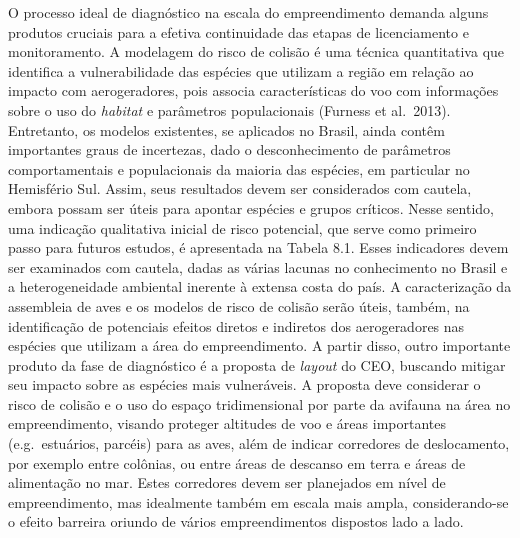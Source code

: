 \documentclass[
  oneside]{scrbook}
\begin{document}
O processo ideal de diagnóstico na escala do empreendimento demanda alguns produtos cruciais para a efetiva continuidade das etapas de licenciamento e monitoramento. A modelagem do risco de colisão é uma técnica quantitativa que identifica a vulnerabilidade das espécies que utilizam a região em relação ao impacto com aerogeradores, pois associa características do voo com informações sobre o uso do \emph{habitat} e parâmetros populacionais (Furness et al.~2013). Entretanto, os modelos existentes, se aplicados no Brasil, ainda contêm importantes graus de incertezas, dado o desconhecimento de parâmetros comportamentais e populacionais da maioria das espécies, em particular no Hemisfério Sul. Assim, seus resultados devem ser considerados com cautela, embora possam ser úteis para apontar espécies e grupos críticos. Nesse sentido, uma indicação qualitativa inicial de risco potencial, que serve como primeiro passo para futuros estudos, é apresentada na Tabela 8.1. Esses indicadores devem ser examinados com cautela, dadas as várias lacunas no conhecimento no Brasil e a heterogeneidade ambiental inerente à extensa costa do país. A caracterização da assembleia de aves e os modelos de risco de colisão serão úteis, também, na identificação de potenciais efeitos diretos e indiretos dos aerogeradores nas espécies que utilizam a área do empreendimento. A partir disso, outro importante produto da fase de diagnóstico é a proposta de \emph{layout} do CEO, buscando mitigar seu impacto sobre as espécies mais vulneráveis. A proposta deve considerar o risco de colisão e o uso do espaço tridimensional por parte da avifauna na área no empreendimento, visando proteger altitudes de voo e áreas importantes (e.g.~estuários, parcéis) para as aves, além de indicar corredores de deslocamento, por exemplo entre colônias, ou entre áreas de descanso em terra e áreas de alimentação no mar. Estes corredores devem ser planejados em nível de empreendimento, mas idealmente também em escala mais ampla, considerando-se o efeito barreira oriundo de vários empreendimentos dispostos lado a lado.

\bigskip
\end{document}
